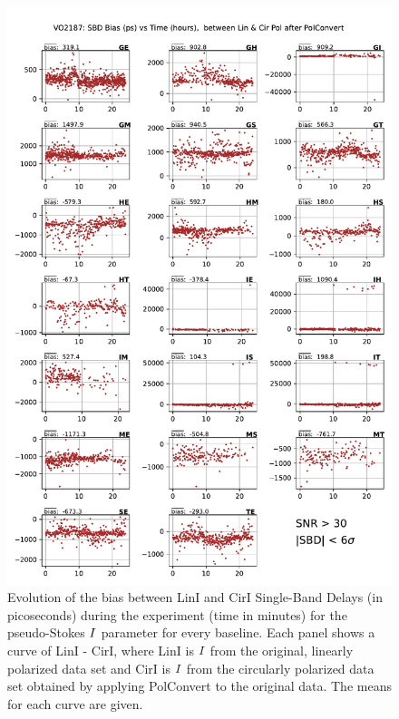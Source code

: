 \documentclass[letterpaper,twoside,12pt]{article}
\begin{document}
\begin{figure}[ht!]
  \begin{center}
  \includegraphics[width=33pc]{VO2187_SBD_bias_between_Lin_I_and_Cir_I_SNR_floor_30.pdf}
  \caption{\small Evolution of the bias between LinI and CirI Single-Band Delays (in picoseconds) during the experiment (time in minutes) for the pseudo-Stokes $\protect I$ parameter for every baseline. Each panel shows a curve of LinI - CirI, where LinI is $\protect I$ from the original, linearly polarized data set and CirI is $\protect I$ from the circularly polarized data set obtained by applying PolConvert to the original data. The means for each curve are given.}
  \label{sbd_lin_cir_bias}
  \end{center}
\end{figure}
\end{document}
